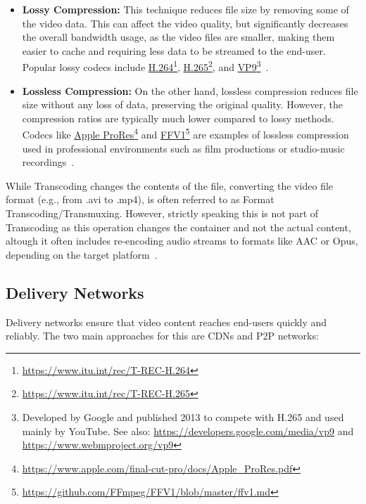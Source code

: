 \begin{itemize}
    \item \textbf{Lossy Compression:} This technique reduces file size by removing some of the video data. This can affect the video quality, but significantly decreases the overall bandwidth usage, as the video files are smaller, making them easier to cache and requiring less data to be streamed to the end-user. Popular lossy codecs include \href{https://www.itu.int/rec/T-REC-H.264}{H.264}\footnote{\url{https://www.itu.int/rec/T-REC-H.264}}, \href{https://www.itu.int/rec/T-REC-H.265}{H.265}\footnote{\url{https://www.itu.int/rec/T-REC-H.265}}, and \href{https://developers.google.com/media/vp9}{VP9}\footnote{Developed by Google and published 2013 to compete with H.265 and used mainly by YouTube. See also: \url{https://developers.google.com/media/vp9} and \url{https://www.webmproject.org/vp9}}~\parencite{combression}.
    \item \textbf{Lossless Compression:} On the other hand, lossless compression reduces file size without any loss of data, preserving the original quality. However, the compression ratios are typically much lower compared to lossy methods. Codecs like \href{https://www.apple.com/final-cut-pro/docs/Apple_ProRes.pdf}{Apple ProRes}\footnote{\url{https://www.apple.com/final-cut-pro/docs/Apple_ProRes.pdf}} and \href{https://github.com/FFmpeg/FFV1/blob/master/ffv1.md}{FFV1}\footnote{\url{https://github.com/FFmpeg/FFV1/blob/master/ffv1.md}} are examples of lossless compression used in professional environments such as film productions or studio-music recordings~\parencite{combression}.
\end{itemize}

While Transcoding changes the contents of the file, converting the video file format (e.g., from .avi to .mp4), is often referred to as Format Transcoding/Transmuxing. However, strictly speaking this is not part of Transcoding as this operation changes the container and not the actual content, altough it often includes re-encoding audio streams to formats like AAC or Opus, depending on the target platform~\parencite{transcoding}.

\subsection{Delivery Networks}
Delivery networks ensure that video content reaches end-users quickly and reliably. The two main approaches for this are \ac{CDN}s and \ac{P2P} networks:

